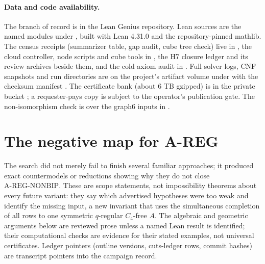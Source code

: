 \documentclass{anvil-paper}
\newcommand{\NONBIP}{\mathrm{A\text{-}REG\text{-}NONBIP}}
\theoremstyle{definition}
\begin{document}
\paragraph{Data and code availability.} The branch of record is  in the Lean Genius repository. Lean sources are the named modules under , built with Lean 4.31.0 and the repository-pinned mathlib. The census receipts (summarizer table, gap audit, cube tree check) live in , the cloud controller, node scripts and cube tools in , the H7 closure ledger and its review archives beside them, and the cold axiom audit in . Full solver logs, CNF snapshots and run directories are on the project's artifact volume under  with the checksum manifest . The certificate bank (about 6 TB gzipped) is in the private bucket ; a requester-pays copy is subject to the operator's publication gate. The non-isomorphism check is  over the graph6 inputs in .

\appendix

\section{The negative map for A-REG}\label{app:negative}

The search did not merely fail to finish several familiar approaches; it produced exact countermodels or reductions showing why they do not close $\NONBIP$. These are scope statements, not impossibility theorems about every future variant: they say which advertised hypotheses were too weak and identify the missing input, a new invariant that uses the simultaneous completion of all rows to one symmetric $q$-regular $C_4$-free $A$. The algebraic and geometric arguments below are reviewed prose unless a named Lean result is identified; their computational checks are evidence for their stated examples, not universal certificates. Ledger pointers (outline versions, cuts-ledger rows, commit hashes) are transcript pointers into the campaign record.
\end{document}
